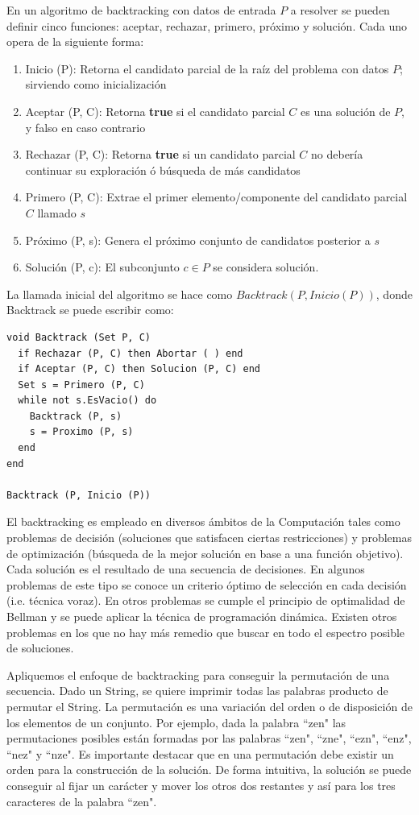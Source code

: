 En un algoritmo de backtracking con datos de entrada $P$ a resolver se pueden definir cinco funciones: aceptar, rechazar, primero, próximo y solución. Cada uno opera de la siguiente forma:
\begin{enumerate}
\item Inicio (P): Retorna el candidato parcial de la raíz del problema con datos $P$; sirviendo como inicialización
\item Aceptar (P, C): Retorna \textbf{true} si el candidato parcial $C$ es una solución de $P$, y falso en caso contrario
\item Rechazar (P, C): Retorna \textbf{true} si un candidato parcial $C$ no debería continuar su exploración ó búsqueda de más candidatos
\item Primero (P, C): Extrae el primer elemento/componente del candidato parcial $C$ llamado $s$
\item Próximo (P, s): Genera el próximo conjunto de candidatos posterior a $s$
\item Solución (P, c): El subconjunto $c \in P$ se considera solución.
\end{enumerate}

La llamada inicial del algoritmo se hace como $Backtrack (P, Inicio (P))$, donde Backtrack se puede escribir como:

\begin{lstlisting}[upquote=true, language=pseudo]
void Backtrack (Set P, C)
  if Rechazar (P, C) then Abortar ( ) end
  if Aceptar (P, C) then Solucion (P, C) end
  Set s = Primero (P, C)
  while not s.EsVacio() do
    Backtrack (P, s)
    s = Proximo (P, s)
  end
end

Backtrack (P, Inicio (P))
\end{lstlisting}

El backtracking es empleado en diversos ámbitos de la Computación tales como problemas de decisión (soluciones que satisfacen ciertas restricciones) y problemas de optimización (búsqueda de la mejor solución en base a una función objetivo). Cada solución es el resultado de una secuencia de decisiones. En algunos problemas de este tipo se conoce un criterio óptimo de selección en cada decisión (i.e. técnica voraz). En otros problemas se cumple el principio de optimalidad de Bellman y se puede aplicar la técnica de programación dinámica. Existen otros problemas en los que no hay más remedio que buscar en todo el espectro posible de soluciones.

Apliquemos el enfoque de backtracking para conseguir la permutación de una secuencia. Dado un String, se quiere imprimir todas las palabras producto de permutar el String. La permutación es una variación del orden o de disposición de los elementos de un conjunto. Por ejemplo, dada la palabra ``zen" las permutaciones posibles están formadas por las palabras ``zen", ``zne", ``ezn", ``enz", ``nez" y ``nze". Es importante destacar que en una permutación debe existir un orden para la construcción de la solución. De forma intuitiva, la solución se puede conseguir al fijar un carácter y mover los otros dos restantes y así para los tres caracteres de la palabra ``zen".


